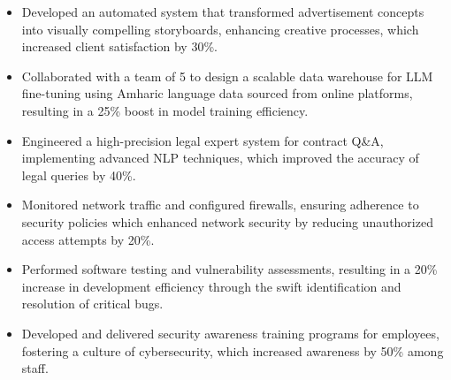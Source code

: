 \documentclass{minimal}
\begin{document}
\begin{adjustwidth}{2em}{0em}
\begin{flushleft}{}\end{flushleft}
\begin{itemize}
    \item Developed an automated system that transformed advertisement concepts into visually compelling storyboards, enhancing creative processes, which increased client satisfaction by 30\%.
\end{itemize}
\begin{itemize}
    \item Collaborated with a team of 5 to design a scalable data warehouse for LLM fine{-}tuning using Amharic language data sourced from online platforms, resulting in a 25\% boost in model training efficiency.
\end{itemize}
\begin{itemize}
    \item Engineered a high{-}precision legal expert system for contract Q\&A, implementing advanced NLP techniques, which improved the accuracy of legal queries by 40\%.
\end{itemize}
\vspace{0.5em}
\begin{flushleft}{}\end{flushleft}
\begin{itemize}
    \item Monitored network traffic and configured firewalls, ensuring adherence to security policies which enhanced network security by reducing unauthorized access attempts by 20\%.
\end{itemize}
\begin{itemize}
    \item Performed software testing and vulnerability assessments, resulting in a 20\% increase in development efficiency through the swift identification and resolution of critical bugs.
\end{itemize}
\begin{itemize}
    \item Developed and delivered security awareness training programs for employees, fostering a culture of cybersecurity, which increased awareness by 50\% among staff.

\end{itemize}
\end{adjustwidth}
\end{document}
